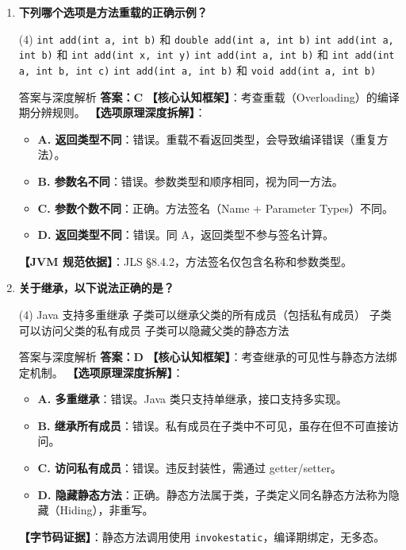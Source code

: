 ﻿\documentclass[12pt, a4paper]{ctexart}
\newcommand{\code}[1]{\texttt{#1}}
\begin{document}
\begin{enumerate}[label=\textbf{\arabic*.}, itemsep=1em]
	\item \textbf{下列哪个选项是方法重载的正确示例？}
	      \begin{tasks}(4)
		      \task \code{int add(int a, int b)} 和 \code{double add(int a, int b)}
		      \task \code{int add(int a, int b)} 和 \code{int add(int x, int y)}
		      \task \code{int add(int a, int b)} 和 \code{int add(int a, int b, int c)}
		      \task \code{int add(int a, int b)} 和 \code{void add(int a, int b)}
	      \end{tasks}
	      \begin{bluebox}{答案与深度解析}
		      \textbf{答案：C}
		      \textbf{【核心认知框架】}：考查重载（Overloading）的编译期分辨规则。
		      \textbf{【选项原理深度拆解】}：
		      \begin{itemize}[leftmargin=*, nosep]
			      \item \textbf{A. 返回类型不同}：错误。重载不看返回类型，会导致编译错误（重复方法）。
			      \item \textbf{B. 参数名不同}：错误。参数类型和顺序相同，视为同一方法。
			      \item \textbf{C. 参数个数不同}：正确。方法签名（Name + Parameter Types）不同。
			      \item \textbf{D. 返回类型不同}：错误。同 A，返回类型不参与签名计算。
		      \end{itemize}
		      \textbf{【JVM 规范依据】}：JLS §8.4.2，方法签名仅包含名称和参数类型。
	      \end{bluebox}

	\item \textbf{关于继承，以下说法正确的是？}
	      \begin{tasks}(4)
		      \task Java 支持多重继承 \task 子类可以继承父类的所有成员（包括私有成员）
		      \task 子类可以访问父类的私有成员 \task 子类可以隐藏父类的静态方法
	      \end{tasks}
	      \begin{bluebox}{答案与深度解析}
		      \textbf{答案：D}
		      \textbf{【核心认知框架】}：考查继承的可见性与静态方法绑定机制。
		      \textbf{【选项原理深度拆解】}：
		      \begin{itemize}[leftmargin=*, nosep]
			      \item \textbf{A. 多重继承}：错误。Java 类只支持单继承，接口支持多实现。
			      \item \textbf{B. 继承所有成员}：错误。私有成员在子类中不可见，虽存在但不可直接访问。
			      \item \textbf{C. 访问私有成员}：错误。违反封装性，需通过 getter/setter。
			      \item \textbf{D. 隐藏静态方法}：正确。静态方法属于类，子类定义同名静态方法称为隐藏（Hiding），非重写。
		      \end{itemize}
		      \textbf{【字节码证据】}：静态方法调用使用 \code{invokestatic}，编译期绑定，无多态。
	      \end{bluebox}


\end{enumerate}
\end{document}
